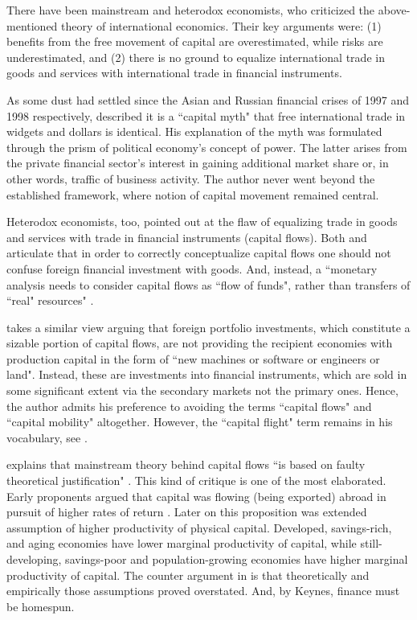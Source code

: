 There have been mainstream and heterodox economists, who criticized the above-mentioned theory of international economics. Their key arguments were: (1) benefits from the free movement of capital are overestimated, while risks are underestimated, and (2) there is no ground to equalize international trade in goods and services with international trade in financial instruments.

As some dust had settled since the Asian and Russian financial crises of 1997 and 1998 respectively, \cite{bhagwati1998a} described it is a ``capital myth" that free international trade in widgets and dollars is identical.
His explanation of the myth was formulated through the prism of political economy's concept of power.
The latter arises from the private financial sector's interest in gaining additional market share or, in other words, traffic of business activity.
The author never went beyond the established framework, where notion of capital movement remained central.

Heterodox economists, too, pointed out at the flaw of equalizing trade in goods and services with trade in financial instruments (capital flows). Both \cite{carvalho2009} and \cite{bonizzi2017} articulate that in order to correctly conceptualize capital flows one should not confuse foreign financial investment with goods. And, instead, a ``monetary analysis needs to consider capital flows as ``flow of funds", rather than transfers of ``real" resources" \citep{bonizzi2017}.

\cite{mason2015} takes a similar view arguing that foreign portfolio investments, which constitute a sizable portion of capital flows, are not providing the recipient economies with production capital in the form of ``new machines or software or engineers or land".
Instead, these are investments into financial instruments, which are sold in some significant extent via the secondary markets not the primary ones.
Hence, the author admits his preference to avoiding the terms ``capital flows" and ``capital mobility" altogether.
However, the ``capital flight" term remains in his vocabulary, see \citep{mason2016}.

\cite{kregel2008,kregel2015} explains that mainstream theory behind capital flows ``is based on faulty theoretical justification" \citep[p.~219]{kregel2008}.
This kind of critique is one of the most elaborated.
Early proponents argued that capital was flowing (being exported) abroad in pursuit of higher rates of return \citep{viner1928_1}.
Later on this proposition was extended assumption of higher productivity of physical capital.
Developed, savings-rich, and aging economies have lower marginal productivity of capital, while still-developing, savings-poor and population-growing economies have higher marginal productivity of capital.
The counter argument in \citep{kregel2008,kregel2015} is that theoretically and empirically those assumptions proved overstated.
And, by Keynes, finance must be homespun.

